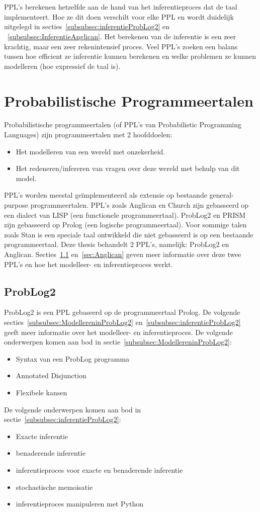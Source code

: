 \documentclass[12pt,a4paper,oneside]{book}
\theoremstyle{definition}
\begin{document}
\\\\
PPL's berekenen hetzelfde aan de hand van het inferentieproces dat de taal implementeert. Hoe ze dit doen verschilt voor elke PPL en wordt duidelijk uitgelegd in secties~\ref{subsubsec:inferentieProbLog2} en ~\ref{subsubsec:InferentieAnglican}. Het berekenen van de inferentie is een zeer krachtig, maar een zeer rekenintensief proces. Veel PPL's zoeken een balans tussen hoe efficient ze inferentie kunnen berekenen en welke problemen ze kunnen modelleren (hoe expressief de taal is).

\section{Probabilistische Programmeertalen}
Probabilistische programmeertalen (of PPL's van Probabilistic Programming Languages) zijn programmeertalen met 2 hoofddoelen:
\begin{itemize}
  \item Het modelleren van een wereld met onzekerheid.
  \item Het redeneren/infereren van vragen over deze wereld met behulp van dit model.
\end{itemize}
PPL's worden meestal ge\"{i}mplementeerd als extensie op bestaande general-purpose programmeertalen. PPL's zoals Anglican en Church zijn gebasseerd op een dialect van LISP (een functionele programmeertaal). ProbLog2 en PRISM zijn gebasseerd op Prolog (een logische programmeertaal). Voor sommige talen zoals Stan is een speciale taal ontwikkeld die niet gebasseerd is op een bestaande programmeertaal.
Deze thesis behandelt 2 PPL's, namelijk: ProbLog2 en Anglican. Secties~\ref{sec:ProbLog2} en~\ref{sec:Anglican} geven meer informatie over deze twee PPL's en hoe het modelleer- en inferentieproces werkt.
\subsection{ProbLog2}
\label{sec:ProbLog2}
ProbLog2 is een PPL gebaseerd op de programmeertaal Prolog. De volgende secties~\ref{subsubsec:ModellereninProbLog2} en~\ref{subsubsec:inferentieProbLog2} geeft meer informatie over het modelleer- en inferentieproces. De volgende onderwerpen komen aan bod in sectie~\ref{subsubsec:ModellereninProbLog2}:
\begin{itemize}
	\item Syntax van een ProbLog programma
	\item Annotated Disjunction
	\item Flexibele kansen
\end{itemize} 
De volgende onderwerpen komen aan bod in sectie~\ref{subsubsec:inferentieProbLog2}:
\begin{itemize}
	\item Exacte inferentie
	\item benaderende inferentie
	\item inferentieproces voor exacte en benaderende inferentie
	\item stochastische memoisatie
	\item inferentieproces manipuleren met Python
\end{itemize} 
\end{document}
